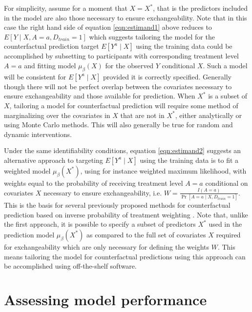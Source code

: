 For simplicity, assume for a moment that $X = X^*$, that is the predictors included in the model are also those necessary to ensure exchangeability. Note that in this case the right hand side of equation \ref{eqn:estimand1} above reduces to $E[Y \mid X, A = a, D_{train} =1]$ which suggests tailoring the model for the counterfactual prediction target $E[Y^a \mid X]$ using the training data could be accomplished by subsetting to participants with corresponding treatment level $A = a$ and fitting model $\mu_\beta(X)$ for the observed $Y$ conditional $X$. Such a model will be consistent for $E[Y^a \mid X]$ provided it is correctly specified. Generally though there will not be perfect overlap between the covariates necessary to ensure exchangeability and those available for prediction. When $X^*$ is a subset of $X$, tailoring a model for counterfactual prediction will require some method of marginalizing over the covariates in $X$ that are not in $X^*$, either analytically or using Monte Carlo methods. This will also generally be true for random and dynamic interventions.

Under the same identifiability conditions, equation \ref{eqn:estimand2} suggests an alternative approach to targeting $E[Y^a \mid X]$ using the training data is to fit a weighted model $\mu_\beta(X^*)$, using for instance weighted maximum likelihood, with weights equal to the probability of receiving treatment level $A = a$ conditional on covariates $X$ necessary to ensure exchangeability, i.e. $W = \frac{I(A = a)}{\Pr[A = a \mid X, D_{train} = 1]}$. This is the basis for several previously proposed methods for counterfactual prediction based on inverse probability of treatment weighting \cite{sperrin_using_2018}. Note that, unlike the first approach, it is possible to specify a subset of predictors $X^*$ used in the prediction model $\mu_\beta(X^*)$ as compared to the full set of covariates $X$ required for exchangeability which are only necessary for defining the weights $W$. This means tailoring the model for counterfactual predictions using this approach can be accomplished using off-the-shelf software.

\section{Assessing model performance} \label{sec:performance}

